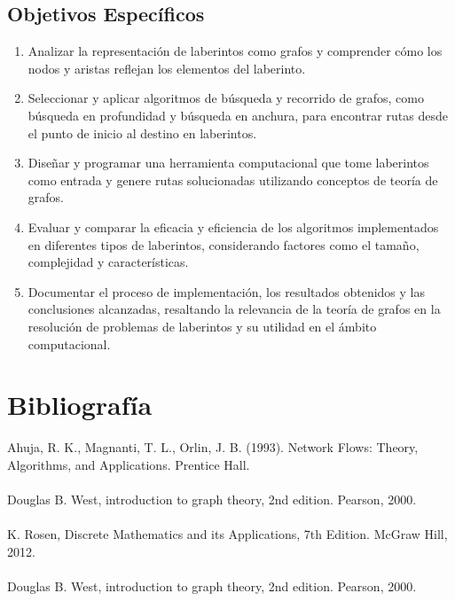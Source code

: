 \documentclass[conference]{IEEEtran}
\begin{document}
	\subsection{Objetivos Específicos}
	\vspace{0.3cm}
	\begin{enumerate}
		\item Analizar la representación de laberintos como grafos y comprender cómo los nodos y aristas reflejan los elementos del laberinto.
		
		\item Seleccionar y aplicar algoritmos de búsqueda y recorrido de grafos, como búsqueda en profundidad y búsqueda en anchura, para encontrar rutas desde el punto de inicio al destino en laberintos.
		
		\item Diseñar y programar una herramienta computacional que tome laberintos como entrada y genere rutas solucionadas utilizando conceptos de teoría de grafos.
		
		\item Evaluar y comparar la eficacia y eficiencia de los algoritmos implementados en diferentes tipos de laberintos, considerando factores como el tamaño, complejidad y características.
		
		\item Documentar el proceso de implementación, los resultados obtenidos y las conclusiones alcanzadas, resaltando la relevancia de la teoría de grafos en la resolución de problemas de laberintos y su utilidad en el ámbito computacional.
	\end{enumerate}
	
	
	\section{Bibliografía}
	Ahuja, R. K., Magnanti, T. L., Orlin, J. B. (1993). Network Flows: Theory, Algorithms, and Applications. Prentice Hall. \\
	\\
	Douglas B. West, introduction to graph theory, 2nd edition. Pearson, 2000.\\
	\\
	K. Rosen, Discrete Mathematics and its Applications, 7th Edition. McGraw Hill, 2012.\\
	\\
	Douglas B. West, introduction to graph theory, 2nd edition. Pearson, 2000.
	
	
	
\end{document}
